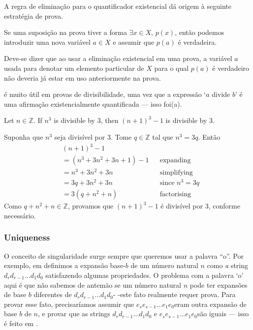 A regra de eliminação para o quantificador existencial dá origem à seguinte estratégia de prova.

\begin{strategy}
\label{strAssumingExistential}
Se uma suposição na prova tiver a forma $\exists x \in X,\, p(x)$, então podemos introduzir uma nova variável $a \in X$ e assumir que $p(a)$ é verdadeira.
\end{strategy}

Deve-se dizer que ao usar a eliminação existencial em uma prova, a variável $a$ usada para denotar um elemento particular de $X$ para o qual $p(a)$ é verdadeiro não deveria já estar em uso anteriormente na prova.

 é muito útil em provas de divisibilidade, uma vez que a expressão `$a$ divide $b$' é uma afirmação existencialmente quantificada --- isso foi(a).

\begin{proposition}
Let $n \in \mathbb{Z}$. If $n^3$ is divisible by $3$, then $(n+1)^3 - 1$ is divisible by $3$.
\end{proposition}

\begin{cproof}
Suponha que $n^3$ seja divisível por $3$. Tome $q \in \mathbb{Z}$ tal que $n^3 = 3q$. Então
\begin{align*}
& (n+1)^3 - 1 && \\
&= (n^3 + 3n^2 + 3n + 1) - 1 && \text{expanding} \\
&= n^3 + 3n^2 + 3n && \text{simplifying} \\
&= 3q + 3n^2 + 3n && \text{since $n^3 = 3q$} \\
&= 3(q+n^2+n) && \text{factorising}
\end{align*}
Como $q+n^2+n \in \mathbb{Z}$, provamos que $(n+1)^3 - 1$ é divisível por $3$, conforme necessário.
\end{cproof}

\subsubsection*{Uniqueness}

O conceito de singularidade surge sempre que queremos usar a palavra “o”. Por exemplo, em  definimos a expansão base-$b$ de um número natural $n$ como \textit{a} string $d_r d_{r-1} \dots d_1 d_0$ satisfazendo algumas propriedades. O problema com a palavra `o' aqui é que não sabemos de antemão se um número natural $n$ pode ter expansões de base $b$ diferentes de $d_r d_{r-1} \dots d_1 d_0$- -este fato realmente requer prova. Para provar esse fato, precisaríamos assumir que $e_s e_{s-1} \dots e_1 e_0$ ​​eram outra expansão de base $b$ de $n$, e provar que as strings $d_r d_{r-1} \dots d_1 d_0$ e $e_s e_{s-1} \dots e_1 e_0$ ​​são iguais --- isso é feito em .

